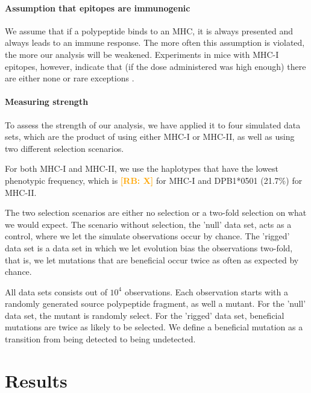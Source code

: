 \documentclass{article}
\newcommand{\richel}[1]{\textcolor{orange}{\textbf{[RB: #1]}}}
\begin{document}
\paragraph{Assumption that epitopes are immunogenic}

We assume that if a polypeptide binds to an MHC, it is always presented and always
leads to an immune response.
The more often this assumption is violated, 
the more our analysis will be weakened.
Experiments in mice with MHC-I epitopes, however, indicate that (if the dose 
administered was high enough) there are either none or rare
exceptions \cite{sette1994relationship}.

\paragraph{Measuring strength}

To assess the strength of our analysis, 
we have applied it to four simulated data sets,
which are the product of using either MHC-I or MHC-II,
as well as using two different selection scenarios.

For both MHC-I and MHC-II, we use the haplotypes that have 
the lowest phenotypic frequency, which is \richel{X} for MHC-I
and DPB1*0501 (21.7\%) for MHC-II.

The two selection scenarios are either no selection
or a two-fold selection on what we would expect.
The scenario without selection, the 'null' data set, acts 
as a control, where we let the simulate observations occur by chance. 
The 'rigged' data set is a data set in which we 
let evolution bias the observations two-fold, that is, 
we let mutations that are beneficial occur twice as often as expected by chance.

All data sets consists out of $10^4$ observations.
Each observation starts with a randomly generated source polypeptide fragment,
as well a mutant. For the 'null' data set, the mutant is randomly select.
For the 'rigged' data set, beneficial mutations are twice as likely to
be selected. We define a beneficial mutation as a transition from
being detected to being undetected.

\section{Results}

\end{document}
